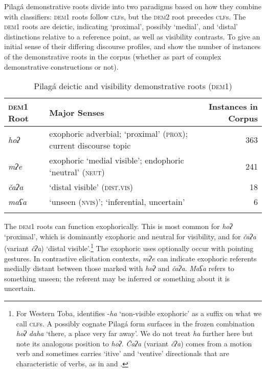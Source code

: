 \documentclass[output=paper,colorlinks,citecolor=brown]{langscibook}
\begin{document}
Pilagá demonstrative roots divide into two paradigms based on how they combine with classifiers: \textsc{dem1} roots follow \textsc{clf}s, but the \textsc{dem2} root precedes \textsc{clf}s. The \textsc{dem1} roots are deictic, indicating ‘proximal’, possibly ‘medial’, and ‘distal’ distinctions relative to a reference point, as well as visibility contrasts. To give an initial sense of their differing discourse profiles,  and  show the number of instances of the demonstrative roots in the corpus (whether as part of complex demonstrative constructions or not).

\begin{table}
\begin{tabularx}{\textwidth}{lQr}
\lsptoprule
{\bfseries \textsc{dem1} Root} & {\bfseries Major Senses} & {\bfseries Instances in Corpus}\\
\midrule
{\textit{hoʔ}} & {exophoric adverbial; ‘proximal’ (\textsc{prox}); current discourse topic} & 363\\
\tablevspace
{\textit{mʔe}} & exophoric ‘medial visible’; endophoric ‘neutral’ (\textsc{neut}) & 241\\
\tablevspace
{\textit{čaʔa}} & {‘distal visible’ (\textsc{dist.vis})} & 18\\
\tablevspace
{\textit{maʕa}} & {‘unseen (\textsc{nvis})’; ‘inferential, uncertain’} & 6\\
\lspbottomrule
\end{tabularx}
\caption{Pilagá deictic and visibility demonstrative roots (\textsc{dem1})}
\label{tab:payne:2}
\end{table}

The \textsc{dem1} roots can function exophorically. This is most common for \textit{hoʔ} ‘proximal’, which is dominantly exophoric and neutral for visibility, and for \textit{čaʔa} (variant \textit{čʔa}) ‘distal visible’.\footnote{For Western Toba, \citet[47-49]{Carpio2012} identifies -\textit{ha} ‘non-visible exophoric’ as a suffix on what we call \textsc{clf}s. A possibly cognate Pilagá form surfaces in the frozen combination \textit{hoʔ daha} ‘there, a place very far away’. We do not treat \textit{ha} further here but note its analogous position to \textit{hoʔ}. \textit{Čaʔa} (variant \textit{čʔa}) comes from a motion verb and sometimes carries ‘itive’ and ‘ventive’ directionals that are characteristic of verbs, as in  and .} The exophoric uses optionally occur with pointing gestures. In contrastive elicitation contexts, \textit{mʔe} can indicate exophoric referents medially distant between those marked with \textit{hoʔ} and \textit{čaʔa}. \textit{Maʕa} refers to something unseen; the referent may be inferred or something about it is uncertain. 
\end{document}
